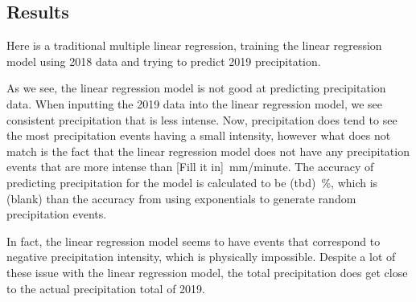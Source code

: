 \documentclass[11pt]{report}
\begin{document}

\subsection{Results}

Here is a traditional multiple linear regression, training the linear
regression model using 2018 data and trying to predict 2019 precipitation.

As we see, the linear regression model is not good at predicting precipitation data. When inputting the 2019 data into the linear regression model, we see consistent precipitation that is less intense. Now, precipitation does tend to see the most precipitation events having a small intensity, however what does not match is the fact that the linear regression model does not have any precipitation events that are more intense than [Fill it in]~mm/minute. The accuracy of predicting precipitation for the model is calculated to be (tbd)~\%, which is (blank) than the accuracy from using exponentials to generate random precipitation events. 

In fact, the linear regression model seems to have events that correspond to negative precipitation intensity, which is physically impossible. Despite a lot of these issue with the linear regression model, the total precipitation does get close to the actual precipitation total of 2019. 
\end{document}
